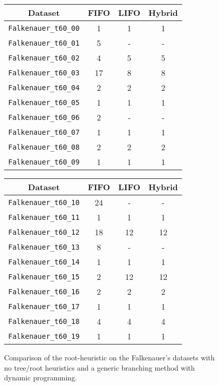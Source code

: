 \begin{figure}[!ht]
	\centering
	\small{
	\begin{minipage}{0.45\linewidth}
		\centering
		\begin{tabular}{|cccc|}
			\hline
			\rowcolor{gray!50}
			Dataset & FIFO & LIFO & Hybrid  \\
			\hline
			\texttt{Falkenauer\_t60\_00} & 1 & 1 & 1  \\
			\texttt{Falkenauer\_t60\_01} & 5 & -  & - \\
			\texttt{Falkenauer\_t60\_02} & 4 & 5 & 5 \\
			\texttt{Falkenauer\_t60\_03} & 17 & 8 & 8 \\
			\texttt{Falkenauer\_t60\_04} & 2 & 2 & 2 \\
			\texttt{Falkenauer\_t60\_05} & 1 & 1 & 1 \\
			\texttt{Falkenauer\_t60\_06} & 2 & - & - \\
			\texttt{Falkenauer\_t60\_07} & 1 & 1 & 1 \\
			\texttt{Falkenauer\_t60\_08} & 2 & 2 & 2 \\
			\texttt{Falkenauer\_t60\_09} & 1 & 1 & 1 \\
			\hline
		\end{tabular}
	\end{minipage}
	\begin{minipage}{0.45\linewidth}
		\centering
		\begin{tabular}{|cccc|}
			\hline
			\rowcolor{gray!50}
			Dataset & FIFO & LIFO & Hybrid  \\
			\hline
			\texttt{Falkenauer\_t60\_10} & 24 & - & - \\
			\texttt{Falkenauer\_t60\_11} & 1 & 1 & 1 \\
			\texttt{Falkenauer\_t60\_12} & 18 & 12 & 12 \\
			\texttt{Falkenauer\_t60\_13} & 8 & - & - \\
			\texttt{Falkenauer\_t60\_14} & 1 & 1 & 1 \\
			\texttt{Falkenauer\_t60\_15} & 2 & 12 & 12 \\
			\texttt{Falkenauer\_t60\_16} & 2 & 2 & 2 \\
			\texttt{Falkenauer\_t60\_17} & 1 & 1 & 1 \\
			\texttt{Falkenauer\_t60\_18} & 4 & 4 & 4 \\
			\texttt{Falkenauer\_t60\_19} & 1 & 1 & 1 \\
			\hline
		\end{tabular}
	\end{minipage}
	\caption{Comparison of the root-heuristic on the Falkenauer's datasets with no tree/root heuristics and a generic branching method with dynamic programming.}
	}
\end{figure}

